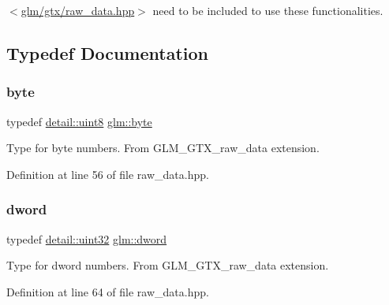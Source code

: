 $<$\hyperlink{raw__data_8hpp}{glm/gtx/raw\+\_\+data.\+hpp}$>$ need to be included to use these functionalities. 

\subsection{Typedef Documentation}
\mbox{\label{group__gtx__raw__data_gacd7fe1f2ad60a57f7d7ad4f1e6836efd}} 
\subsubsection{\texorpdfstring{byte}{byte}}
{\footnotesize\ttfamily typedef \hyperlink{namespaceglm_1_1detail_aef2588f97d090cc19fbbe0c74fe17c8f}{detail\+::uint8} \hyperlink{group__gtx__raw__data_gacd7fe1f2ad60a57f7d7ad4f1e6836efd}{glm\+::byte}}

Type for byte numbers. From G\+L\+M\+\_\+\+G\+T\+X\+\_\+raw\+\_\+data extension. 

Definition at line 56 of file raw\+\_\+data.\+hpp.

\mbox{\label{group__gtx__raw__data_ga1fc2589df6d44e923cd1820cf14805cf}} 
\subsubsection{\texorpdfstring{dword}{dword}}
{\footnotesize\ttfamily typedef \hyperlink{namespaceglm_1_1detail_ade6cfbf377022aaa391af8cd50489222}{detail\+::uint32} \hyperlink{group__gtx__raw__data_ga1fc2589df6d44e923cd1820cf14805cf}{glm\+::dword}}

Type for dword numbers. From G\+L\+M\+\_\+\+G\+T\+X\+\_\+raw\+\_\+data extension. 

Definition at line 64 of file raw\+\_\+data.\+hpp.

\mbox{\label{group__gtx__raw__data_ga32447af289e879589883c9b7e3be1246}} 
